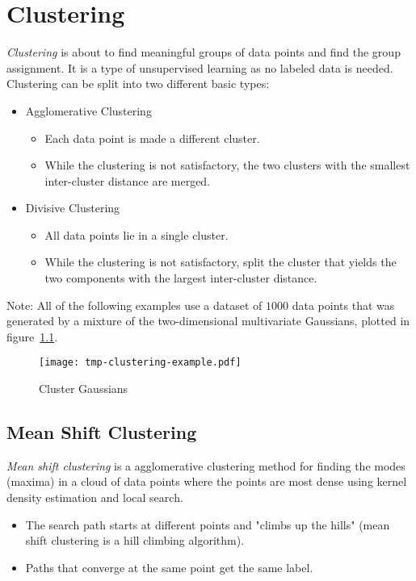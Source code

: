 \chapter{Clustering}
	\emph{Clustering} is about to find meaningful groups of data points and find the group assignment. It is a type of unsupervised learning as no labeled data is needed. Clustering can be split into two different basic types:
	\begin{itemize}
		\item Agglomerative Clustering
			\begin{itemize}
				\item Each data point is made a different cluster.
				\item While the clustering is not satisfactory, the two clusters with the smallest inter-cluster distance are merged.
			\end{itemize}
		\item Divisive Clustering
			\begin{itemize}
				\item All data points lie in a single cluster.
				\item While the clustering is not satisfactory, split the cluster that yields the two components with the largest inter-cluster distance.
			\end{itemize}
	\end{itemize}
	Note: All of the following examples use a dataset of \(1000\) data points that was generated by a mixture of the two-dimensional multivariate Gaussians, plotted in figure~\ref{fig:clusteringExample}.

	\begin{figure}
		\centering
		\texttt{[image: tmp-clustering-example.pdf]}
		\caption{Cluster Gaussians}
		\label{fig:clusteringExample}
	\end{figure}

	\section{Mean Shift Clustering}
		\emph{Mean shift clustering} is a agglomerative clustering method for finding the modes (maxima) in a cloud of data points where the points are most dense using kernel density estimation and local search.
		\begin{itemize}
			\item The search path starts at different points and "climbs up the hills" (mean shift clustering is a hill climbing algorithm).
			\item Paths that converge at the same point get the same label.
		\end{itemize}

